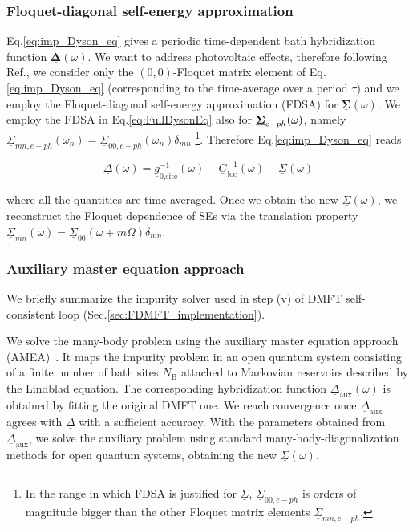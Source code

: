 \documentclass[aps,prb,groupedaddress,showpacs,twocolumn,superscriptaddress,10pt]{revtex4-2}
\newcommand{\mat}[1]{\bm{#1}} %
\newcommand{\kel}[1]{\underline{#1}} %
\begin{document}
\subsubsection{Floquet-diagonal self-energy approximation}
\label{sec:FDSA}
   

Eq.\eqref{eq:imp_Dyson_eq} gives a periodic time-dependent bath hybridization function $\kel{\mat\Delta}(\omega)$. We want to address photovoltaic effects, therefore following Ref.\cite{so.do.18}, we consider only the $(0,0)$-Floquet matrix element of Eq.\eqref{eq:imp_Dyson_eq} (corresponding to the time-average over a period $\tau$) and  we employ the Floquet-diagonal self-energy approximation (FDSA) for $\kel{\mat{\Sigma}}(\omega)$.  We employ the FDSA in Eq.\eqref{eq:FullDysonEq} also for $\underline{\bf{\Sigma}}_{e-ph}(\omega)$, namely $\kel{\Sigma}_{mn,e-ph}(\omega_n) = \kel{\Sigma}_{00,e-ph}(\omega_n)\delta_{mn}$ \footnote{In the range in which FDSA is justified for $\kel{\Sigma}$, $\kel{\Sigma}_{00,e-ph}$ is orders of magnitude bigger than the other Floquet matrix elements $\kel{\Sigma}_{mn,e-ph}$.}.  Therefore Eq.\eqref{eq:imp_Dyson_eq} reads  

\begin{equation}\label{eq:imp_Dyson_eq_av}
\kel{\Delta}(\omega) = \kel{g}^{-1}_{\text{0,site}}(\omega) - \kel{G}^{-1}_{\text{loc}}(\omega) - \kel{\Sigma}(\omega)
\end{equation}

where all the quantities are time-averaged. Once we obtain the new $\kel{\Sigma}(\omega)$, we reconstruct the Floquet dependence of SEs via the translation property $\kel{\Sigma}_{mn}(\omega) = \kel{\Sigma}_{00}(\omega+m\Omega)\delta_{mn}$.  
	  
\subsubsection{Auxiliary master equation approach}
\label{sec:amea}


We briefly summarize the impurity solver used in step (v) of DMFT self-consistent loop (Sec.\ref{sec:FDMFT_implementation}). 

We solve the many-body problem using the auxiliary master equation approach (AMEA)~\cite{ar.kn.13,do.nu.14,do.ga.15,do.so.17}. It maps the impurity problem in an open quantum system consisting of a finite number of bath sites $N_{\text{B}}$ attached to Markovian reservoirs described by the Lindblad equation. The corresponding hybridization function $\kel{\Delta}_{\text{aux}}(\omega)$ is obtained by fitting the original DMFT one. We reach convergence once $\kel{\Delta}_{\text{aux}}$ agrees with $\kel{\Delta}$ with a sufficient accuracy. With the parameters obtained from $\kel{\Delta}_{\text{aux}}$, we solve the auxiliary problem using standard many-body-diagonalization methods for open quantum systems, obtaining the new $\kel{\Sigma}(\omega)$. 
	
\end{document}
